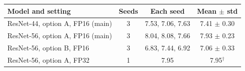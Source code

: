 \begin{tabular}{@{}lccc@{}}
\toprule
Model and setting & Seeds & Each seed & Mean $\pm$ std \\
\midrule
ResNet-44, option A, FP16 (main) & 3 & 7.53, 7.06, 7.63 & 7.41 $\pm$ 0.30 \\
ResNet-56, option A, FP16 (main) & 3 & 8.04, 8.08, 7.66 & 7.93 $\pm$ 0.23 \\
ResNet-56, option B, FP16 & 3 & 6.83, 7.44, 6.92 & 7.06 $\pm$ 0.33 \\
ResNet-56, option A, FP32 & 1 & 7.95 & 7.95$^{\dagger}$ \\
\bottomrule
\end{tabular}
